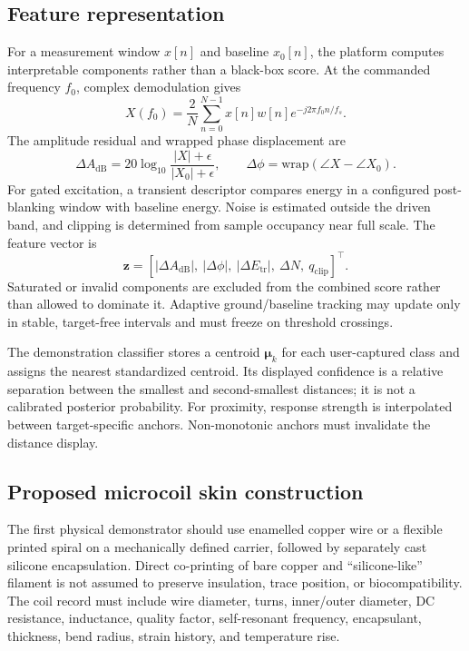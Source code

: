 \documentclass[10pt]{article}
\begin{document}
\subsection{Feature representation}
For a measurement window $x[n]$ and baseline $x_0[n]$, the platform computes interpretable components rather than a black-box score. At the commanded frequency $f_0$, complex demodulation gives
\begin{equation}
X(f_0)=\frac{2}{N}\sum_{n=0}^{N-1}x[n]w[n]e^{-j2\pi f_0n/f_s}.
\end{equation}
The amplitude residual and wrapped phase displacement are
\begin{equation}
\Delta A_{\mathrm{dB}}=20\log_{10}\frac{|X|+\epsilon}{|X_0|+\epsilon},\qquad
\Delta\phi=\mathrm{wrap}(\angle X-\angle X_0).
\end{equation}
For gated excitation, a transient descriptor compares energy in a configured post-blanking window with baseline energy. Noise is estimated outside the driven band, and clipping is determined from sample occupancy near full scale. The feature vector is
\begin{equation}
\mathbf{z}=[|\Delta A_{\mathrm{dB}}|,\ |\Delta\phi|,\ |\Delta E_{\mathrm{tr}}|,\ \Delta N,\ q_{\mathrm{clip}}]^{\top}.
\end{equation}
Saturated or invalid components are excluded from the combined score rather than allowed to dominate it. Adaptive ground/baseline tracking may update only in stable, target-free intervals and must freeze on threshold crossings.

The demonstration classifier stores a centroid $\bm\mu_k$ for each user-captured class and assigns the nearest standardized centroid. Its displayed confidence is a relative separation between the smallest and second-smallest distances; it is not a calibrated posterior probability. For proximity, response strength is interpolated between target-specific anchors. Non-monotonic anchors must invalidate the distance display.

\subsection{Proposed microcoil skin construction}
The first physical demonstrator should use enamelled copper wire or a flexible printed spiral on a mechanically defined carrier, followed by separately cast silicone encapsulation. Direct co-printing of bare copper and ``silicone-like'' filament is not assumed to preserve insulation, trace position, or biocompatibility. The coil record must include wire diameter, turns, inner/outer diameter, DC resistance, inductance, quality factor, self-resonant frequency, encapsulant, thickness, bend radius, strain history, and temperature rise.
\end{document}
